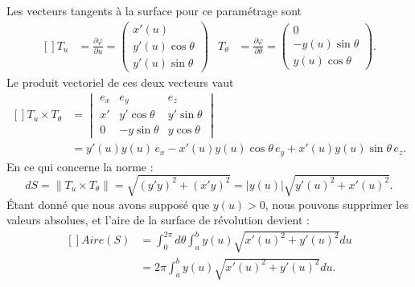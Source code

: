 Les vecteurs tangents à la surface pour ce paramétrage sont
\begin{equation}
	\begin{aligned}[]
		T_u        & =\frac{ \partial \varphi }{ \partial u }=\begin{pmatrix}
			                                                      x'(u)           \\
			                                                      y'(u)\cos\theta \\
			                                                      y'(u)\sin\theta
		                                                      \end{pmatrix}      &
		T_{\theta} & =\frac{ \partial \varphi }{ \partial \theta }=\begin{pmatrix}
			                                                           0               \\
			                                                           -y(u)\sin\theta \\
			                                                           y(u)\cos\theta
		                                                           \end{pmatrix}.
	\end{aligned}
\end{equation}
Le produit vectoriel de ces deux vecteurs vaut
\begin{equation}
	\begin{aligned}[]
		T_u\times T_{\theta} & =\begin{vmatrix}
			                        e_x & e_y          & e_z          \\
			                        x'  & y'\cos\theta & y'\sin\theta \\
			                        0   & -y\sin\theta & y\cos\theta
		                        \end{vmatrix}                                   \\
		                     & =y'(u)y(u)\,e_x-x'(u)y(u)\cos\theta\, e_y+x'(u)y(u)\sin\theta\, e_z.
	\end{aligned}
\end{equation}
En ce qui concerne la norme :
\begin{equation}
	dS=\| T_u\times T_{\theta} \|=\sqrt{(y'y)^2+(x'y)^2}=| y(u) |\sqrt{y'(u)^2+x'(u)^2}.
\end{equation}
Étant donné que nous avons supposé que \( y(u)>0\), nous pouvons supprimer les valeurs absolues, et l'aire de la surface de révolution devient :
\begin{equation}
	\begin{aligned}[]
		Aire(S) & =\int_0^{2\pi}d\theta\int_a^b y(u)\sqrt{x'(u)^2+y'(u)^2}du \\
		        & =2\pi\int_a^b y(u)\sqrt{x'(u)^2+y'(u)^2}du.
	\end{aligned}
\end{equation}

